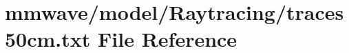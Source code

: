 \hypertarget{traces50cm_8txt}{}\section{mmwave/model/\+Raytracing/traces50cm.txt File Reference}
\label{traces50cm_8txt}
